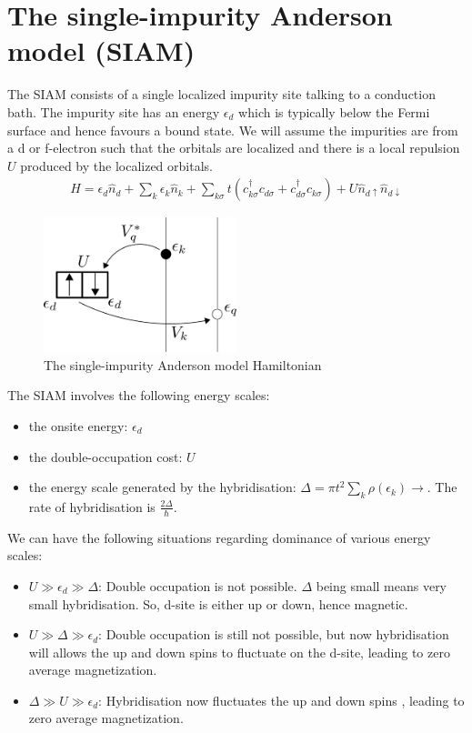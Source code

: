 \documentclass[twoside,11pt]{report}
\numberwithin{equation}{section}
\begin{document}
\section{The single-impurity Anderson model (SIAM)}
The SIAM consists of a single localized impurity site talking to a conduction bath. The impurity site has an energy \(\epsilon_d\) which is typically below the Fermi surface and hence favours a bound state. We will assume the impurities are from a d or f-electron such that the orbitals are localized and there is a local repulsion \(U\) produced by the localized orbitals.
\begin{equation}\begin{aligned}
	\label{model}
	H = \epsilon_d \hat n_d + \sum_{k} \epsilon_k \hat n_k + \sum_{k\sigma}t\left(c^\dagger_{k\sigma}c_{d\sigma}+c^\dagger_{d\sigma}c_{k\sigma}\right) + U\hat n_{d\uparrow}\hat n_{d\downarrow}
\end{aligned}\end{equation}
\begin{figure}[htpb]
	\centering
	\includegraphics[width=0.5\textwidth]{../figures/model_scheme.png}
	\caption{The single-impurity Anderson model Hamiltonian}
\end{figure}
The SIAM involves the following energy scales:
\begin{itemize}
	\item the onsite energy: \(\epsilon_d\)
	\item the double-occupation cost: \(U\)
	\item the energy scale generated by the hybridisation: \(\Delta = \pi t^2\sum_k \rho(\epsilon_k) \rightarrow \). The rate of hybridisation is \(\frac{2\Delta}{\hbar}\).
\end{itemize}
We can have the following situations regarding dominance of various energy scales:
\begin{itemize}
	\item \(U \gg \epsilon_d \gg \Delta\): Double occupation is not possible.
		\(\Delta\) being small means very small hybridisation.
So, d-site is either up or down, hence magnetic.
    \item \(U \gg \Delta\gg \epsilon_d \): Double occupation is still not possible, but now hybridisation will allows the up and down spins to fluctuate on the d-site, leading to zero average magnetization.
    \item \(\Delta\gg U \gg \epsilon_d\): Hybridisation now fluctuates the up and down spins , leading to zero average magnetization.
\end{itemize}
\end{document}

